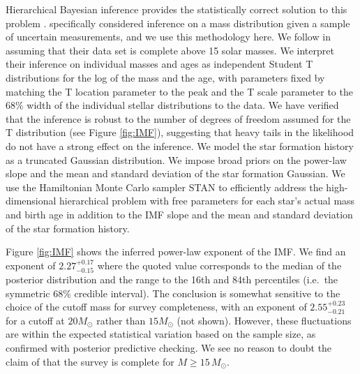 \documentclass[apjl]{emulateapj}
\newcommand{\MSun}{M_\odot}
\newcommand{\onesigrange}[3]{\ensuremath{#1^{+#2}_{-#3}}}
\newcommand{\alpharange}{\onesigrange{2.27}{0.17}{0.15}}
\newcommand{\alpharangeHM}{\onesigrange{2.55}{0.23}{0.21}}
\begin{document}
Hierarchical Bayesian inference provides the statistically correct solution to
this problem \cite{Hogg:2010}.  \citet{Mandel:2010stat} specifically considered
inference on a mass distribution given a sample of uncertain measurements, and
we use this methodology here.  We follow \citet{Schneider:2018} in assuming that
their data set is complete above 15 solar masses.  We interpret their inference
on individual masses and ages as independent Student T distributions for the log
of the mass and the age, with parameters fixed by matching the T location
parameter to the peak and the T scale parameter to the 68\% width of the
individual stellar distributions to the \citet{Schneider:2018} data.  We have
verified that the inference is robust to the number of degrees of freedom
assumed for the T distribution (see Figure \ref{fig:IMF}), suggesting that heavy
tails in the likelihood do not have a strong effect on the inference. We model
the star formation history as a truncated Gaussian distribution.  We impose
broad priors on the power-law slope and the mean and standard deviation of the
star formation Gaussian.    We use the Hamiltonian Monte Carlo sampler STAN
\citep{STAN} to efficiently address the high-dimensional hierarchical problem
with free parameters for each star's actual mass and birth age in addition to
the IMF slope and the mean and standard deviation of the star formation history.

Figure \ref{fig:IMF} shows the inferred power-law exponent of the IMF.  We find
an exponent of $\alpharange$ where the quoted value corresponds to the median of
the posterior distribution and the range to the 16th and 84th percentiles (i.e.\
the symmetric 68\% credible interval).  The conclusion is somewhat sensitive to
the choice of the cutoff mass for survey completeness, with an exponent of
$\alpharangeHM$ for a cutoff at $20 M_\odot$ rather than $15 M_\odot$ (not
shown).  However, these fluctuations are within the expected statistical
variation based on the sample size, as confirmed with posterior predictive
checking.  We see no reason to doubt the claim of \citet{Schneider:2018} that
the survey is complete for $M \geq 15 \, \MSun$.
\end{document}
